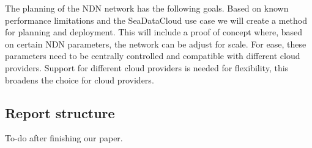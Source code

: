 The planning of the NDN network has the following goals. Based on known performance limitations and the SeaDataCloud use case we will create a method for planning and deployment. This will include a proof of concept where, based on certain NDN parameters, the network can be adjust for scale. For ease, these parameters need to be centrally controlled and compatible with different cloud providers. Support for different cloud providers is needed for flexibility, this broadens the choice for cloud providers.

\subsection{Report structure}
To-do after finishing our paper.


